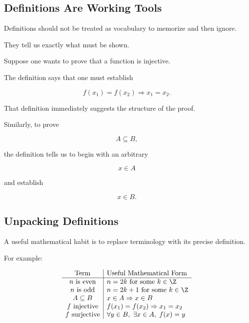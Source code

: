 \subsection{Definitions Are Working Tools}
\label{subsec:definitions-working-tools}

Definitions should not be treated as vocabulary to memorize and then ignore.

They tell us exactly what must be shown.

Suppose one wants to prove that a function is injective.

The definition says that one must establish

\[ f(x_1)=f(x_2)\Longrightarrow x_1=x_2. \]

That definition immediately suggests the structure of the proof.

Similarly, to prove

\[ A\subseteq B, \]

the definition tells us to begin with an arbitrary

\[ x\in A \]

and establish

\[ x\in B. \]

\subsection{Unpacking Definitions}
\label{subsec:unpacking-definitions}

A useful mathematical habit is to replace terminology with its precise
definition.

For example:

\[
\begin{array}{c|l}
\text{Term} & \text{Useful Mathematical Form}\\ \hline
n\text{ is even} & n=2k\text{ for some }k\in\Z\\
n\text{ is odd} & n=2k+1\text{ for some }k\in\Z\\
A\subseteq B & x\in A\Rightarrow x\in B\\
f\text{ injective} & f(x_1)=f(x_2)\Rightarrow x_1=x_2\\
f\text{ surjective} & \forall y\in B,\;\exists x\in A,\;f(x)=y
\end{array}
\]

